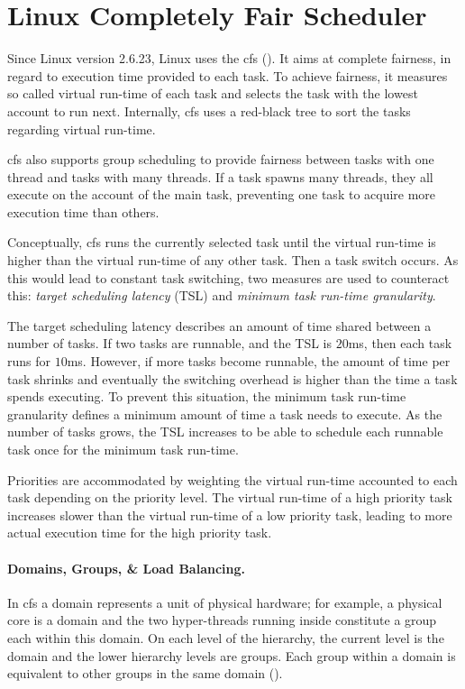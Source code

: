 \section{Linux Completely Fair Scheduler}
\label{state:cfs}


Since Linux version 2.6.23, Linux uses the \gls{cfs} (\cite{linux_cfs_doc}).
It aims at complete fairness, in regard to execution time provided to each task.
To achieve fairness, it measures so called virtual run-time of each task and
selects the task with the lowest account to run next.
Internally, \gls{cfs} uses a red-black tree to sort the tasks regarding virtual
run-time.

\gls{cfs} also supports group scheduling to provide fairness between tasks with one
thread and tasks with many threads.
If a task spawns many threads, they all execute on the account of the main
task, preventing one task to acquire more execution time than others.

Conceptually, \gls{cfs} runs the currently selected task until the virtual run-time is
higher than the virtual run-time of any other task.
Then a task switch occurs.
As this would lead to constant task switching, two measures are used to
counteract this:
\emph{target scheduling latency} (TSL) and \emph{minimum task run-time granularity}.

The target scheduling latency describes an amount of time shared between a
number of tasks.
If two tasks are runnable, and the TSL is $20$ms, then each task runs for $10$ms.
However, if more tasks become runnable, the amount of time per task shrinks and
eventually the switching overhead is higher than the time a task spends
executing.
To prevent this situation, the minimum task run-time granularity defines a
minimum amount of time a task needs to execute.
As the number of tasks grows, the TSL increases to be able to schedule each
runnable task once for the minimum task run-time.

Priorities are accommodated by weighting the virtual run-time accounted to each
task depending on the priority level.
The virtual run-time of a high priority task increases slower than the virtual
run-time of a low priority task, leading to more actual execution time for the
high priority task.

\paragraph{Domains, Groups, \& Load Balancing.}
In \gls{cfs} a domain represents a unit of physical hardware;
for example, a physical core is a domain and the two hyper-threads running
inside constitute a group each within this domain.
On each level of the hierarchy, the current level is the domain and the lower
hierarchy levels are groups.
Each group within a domain is equivalent to other groups in the same domain
(\cite{lwn_sched_domains}).

